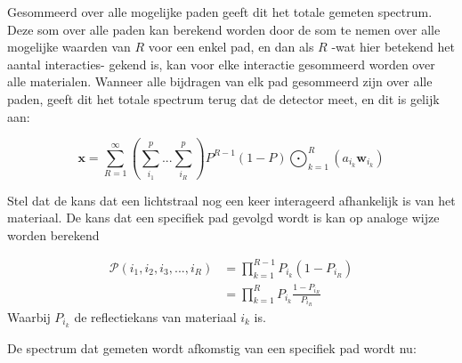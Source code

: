 \documentclass[12pt]{report}
\DeclareMathOperator*{\Odot}{\bigodot}
\begin{document}
Gesommeerd over alle mogelijke paden geeft dit het totale gemeten spectrum. Deze som over alle paden kan berekend worden door de som te nemen over alle mogelijke waarden van $R$ voor een enkel pad, en dan als $R$ -wat hier betekend het aantal interacties- gekend is, kan voor elke interactie gesommeerd worden over alle materialen. Wanneer alle bijdragen van elk pad gesommeerd zijn over alle paden, geeft dit het totale spectrum terug dat de detector meet, en dit is gelijk aan:

\begin{equation}
\bm{x} = \sum_{R=1}^{\infty} \left(\sum_{i_1}^{p} ... \sum_{i_R}^{p}\right)P^{R-1} (1-P) \Odot_{k=1}^R \left(a_{i_k} \bm{w}_{i_k}\right)
\end{equation}

Stel dat de kans dat een lichtstraal nog een keer interageerd afhankelijk is van het materiaal. De kans dat een specifiek pad gevolgd wordt is kan op analoge wijze worden berekend

\begin{align}
\mathcal{P}(i_1,i_2,i_3,...,i_R) &= \prod_{k=1}^{R-1}P_{i_k} (1-P_{i_R})\\
&= \prod_{k=1}^{R}P_{i_k} \frac{1-P_{i_R}}{P_{i_R}}
\end{align}
Waarbij $P_{i_k}$ de reflectiekans van materiaal $i_k$ is. 

De spectrum dat gemeten wordt afkomstig van een specifiek pad wordt nu:
\end{document}
